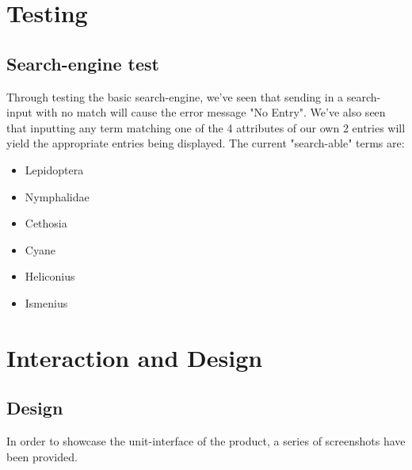 \documentclass[12pt,a4paper]{article}
\begin{document}
\section{Testing}
\subsection{Search-engine test}

Through testing the basic search-engine, we've seen that sending in a search-input with no match will cause the error message "No Entry".
We've also seen that inputting any term matching one of the 4 attributes of our own 2 entries will yield the appropriate entries being displayed. 
The current "search-able" terms are:
\begin{itemize}
	\item Lepidoptera
	\item Nymphalidae
	\item Cethosia
	\item Cyane 
	\item Heliconius
	\item Ismenius
\end{itemize}
\newpage
\section{Interaction and Design}
\subsection{Design}

In order to showcase the unit-interface of the product, a series of screenshots have been provided.
\end{document}

